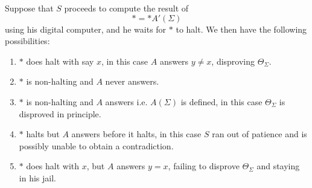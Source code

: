 \documentclass[9pt,twocolumn,twoside,lineno]{pnas-new}
\numberwithin{equation}{section}
\theoremstyle{definition}
\theoremstyle{remark}
\begin{document}
%
%
Suppose that $S$ proceeds to compute the result of $$* = * A' (\Sigma)$$ using his digital computer, and  
he waits for $*$ to halt. We then have the following possibilities:
\begin{enumerate}
   \item $*$ does halt with say $x$, in this case $A$ answers $y \neq x$,  disproving $ \Theta _{\Sigma} $.
   \item $*$ is non-halting and $A$ never answers.
   \item $*$ is non-halting and $A$ answers i.e. $A (\Sigma)$ is defined, in this case $ \Theta _{\Sigma} $ is disproved in principle.
   \item $*$ halts but $A$ answers before it halts,  in this case $S$ ran out of patience and is possibly unable to obtain a contradiction.
\item $*$ does halt with $x$, but $A$ answers $y = x$, failing to disprove $\Theta _{\Sigma} $ and staying in his jail.
\end{enumerate}
\end{document}
